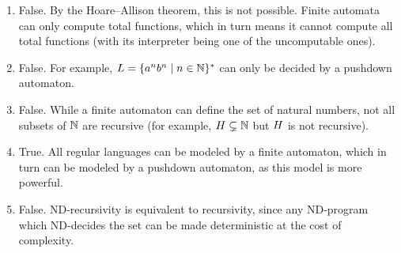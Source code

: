 \begin{solution}
\begin{enumerate}
	\item False.
	By the Hoare--Allison theorem, this is not possible.
	Finite automata can only compute total functions,
	which in turn means it cannot compute all total functions
	(with its interpreter being one of the uncomputable ones).
	\item False.
	For example, \(L = \{a^n b^n \mid n \in \mathbb{N}\}^*\)
	can only be decided by a pushdown automaton.
	\item False.
	While a finite automaton can define the set of natural numbers,
	not all subsets of \(\mathbb{N}\) are recursive
	(for example, \(H \subsetneq \mathbb{N}\) but \(H\) is not recursive).
	\item True.
	All regular languages can be modeled by a finite automaton,
	which in turn can be modeled by a pushdown automaton,
	as this model is more powerful.
	\item False.
	ND-recursivity is equivalent to recursivity,
	since any ND-program which ND-decides the set
	can be made deterministic at the cost of complexity.
\end{enumerate}
\end{solution}
